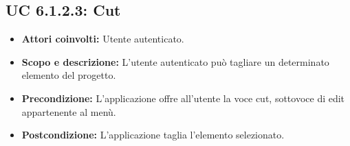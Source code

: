 \subsection{UC 6.1.2.3: Cut}
\begin{itemize}
		\item \textbf{Attori coinvolti:} Utente autenticato. \\
		\item \textbf{Scopo e descrizione:} L'utente autenticato può tagliare un determinato elemento del progetto. \\
		\item \textbf{Precondizione:} L'applicazione offre all'utente la voce cut, sottovoce di edit appartenente al menù. \\
		\item \textbf{Postcondizione:} L'applicazione taglia l'elemento selezionato. \\
\end{itemize}